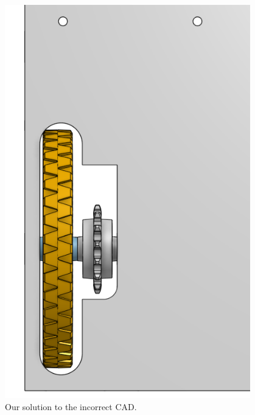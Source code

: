 \begin{figure}[htp]
\centering
\includegraphics[width=0.95\textwidth, angle=0]{Meetings/October/10-16-21/10-16-21_Hardware_Figure2 - Nathan Forrer.PNG}
\caption{Our solution to the incorrect CAD.}
\label{fig:101621_1}
\end{figure}


